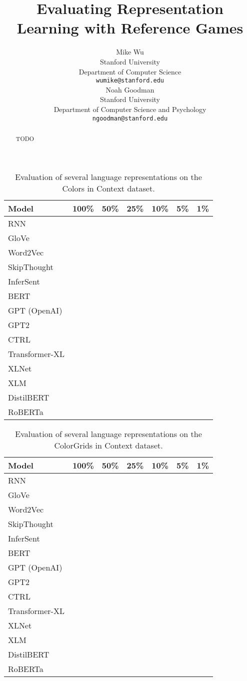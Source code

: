 \documentclass[11pt,a4paper]{article}
\title{Evaluating Representation Learning with Reference Games}
\author{Mike Wu \\
  Stanford University \\
  Department of Computer Science \\
  \texttt{wumike@stanford.edu} \\ \And
  Noah Goodman \\
  Stanford University \\
  Department of Computer Science and Psychology \\
  \texttt{ngoodman@stanford.edu} \\}
\date{}
\begin{document}
\maketitle
\begin{abstract}
TODO
\end{abstract}




\begin{table*}[t!]
\centering
\begin{tabular}{lcccccc}
\hline
\textbf{Model} & \textbf{100\%} & \textbf{50\%} & \textbf{25\%} & \textbf{10\%} & \textbf{5\%} & \textbf{1\%} \\
\hline
RNN & & & & & & \\
GloVe & & & & & & \\
Word2Vec & & & & & & \\
SkipThought & & & & & & \\
InferSent & & & & & & \\
BERT & & & & & & \\
GPT (OpenAI) & & & & & & \\
GPT2 & & & & & & \\
CTRL & & & & & & \\
Transformer-XL & & & & & & \\
XLNet & & & & & & \\
XLM & & & & & & \\
DistilBERT & & & & & & \\
RoBERTa & & & & & & \\
\hline
\end{tabular}
\caption{\label{table:colors} Evaluation of several language representations on the Colors in Context dataset.}
\end{table*}

\begin{table*}[t!]
\centering
\begin{tabular}{lcccccc}
\hline
\textbf{Model} & \textbf{100\%} & \textbf{50\%} & \textbf{25\%} & \textbf{10\%} & \textbf{5\%} & \textbf{1\%} \\
\hline
RNN & & & & & & \\
GloVe & & & & & & \\
Word2Vec & & & & & & \\
SkipThought & & & & & & \\
InferSent & & & & & & \\
BERT & & & & & & \\
GPT (OpenAI) & & & & & & \\
GPT2 & & & & & & \\
CTRL & & & & & & \\
Transformer-XL & & & & & & \\
XLNet & & & & & & \\
XLM & & & & & & \\
DistilBERT & & & & & & \\
RoBERTa & & & & & & \\
\hline
\end{tabular}
\caption{\label{table:colors} Evaluation of several language representations on the ColorGrids in Context dataset.}
\end{table*}
\end{document}
